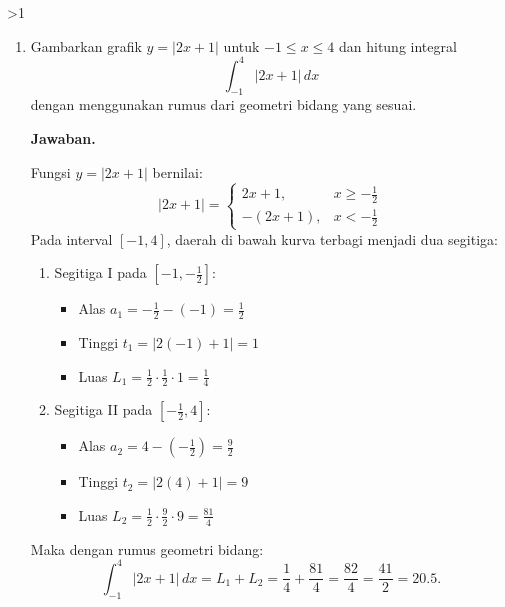 \documentclass[12pt]{article}
\newcommand{\answername}{Jawaban}
\newenvironment{soaljawab}[1]{%
    \ifnum#1>1\clearpage\fi
    \begin{tcolorbox}[enhanced,breakable,height fill,height fixed for=all,
        sharp corners,colback=white,colframe=black,boxrule=0.4bp,
        boxsep=0pt,left=12bp,right=12bp,top=6bp,bottom=10bp,
        before skip=0pt,after skip=0pt,pad at break=8bp]
    \fontsize{12bp}{14bp}\selectfont
    \setlength{\abovedisplayskip}{8bp}
    \setlength{\belowdisplayskip}{8bp}
    \setlength{\abovedisplayshortskip}{8bp}
    \setlength{\belowdisplayshortskip}{8bp}
    \renewcommand{\arraystretch}{1.15}
    \begin{enumerate}[start=#1,topsep=0pt]
}{%
    \end{enumerate}
    \end{tcolorbox}
}
\newcommand{\jawaban}{\par\medskip\textbf{\answername.}\par\smallskip}
\begin{document}
\begin{soaljawab}{3}
\item Gambarkan grafik $y = |2x + 1|$ untuk $-1 \le x \le 4$ dan hitung integral
        \[
          \int_{-1}^{4} |2x + 1| \, dx
        \]
        dengan menggunakan rumus dari geometri bidang yang sesuai.
\jawaban
Fungsi $y = |2x + 1|$ bernilai:
        \[
          |2x + 1| = \begin{cases}
            2x + 1,    & x \ge -\frac{1}{2} \\
            -(2x + 1), & x < -\frac{1}{2}
          \end{cases}
        \]
        Pada interval $[-1, 4]$, daerah di bawah kurva terbagi menjadi dua segitiga:
        \begin{enumerate}
          \item Segitiga I pada $\left[-1, -\frac{1}{2}\right]$:
                \begin{itemize}
                  \item Alas $a_1 = -\frac{1}{2} - (-1) = \frac{1}{2}$
                  \item Tinggi $t_1 = |2(-1) + 1| = 1$
                  \item Luas $L_1 = \frac{1}{2} \cdot \frac{1}{2} \cdot 1 = \frac{1}{4}$
                \end{itemize}
          \item Segitiga II pada $\left[-\frac{1}{2}, 4\right]$:
                \begin{itemize}
                  \item Alas $a_2 = 4 - \left(-\frac{1}{2}\right) = \frac{9}{2}$
                  \item Tinggi $t_2 = |2(4) + 1| = 9$
                  \item Luas $L_2 = \frac{1}{2} \cdot \frac{9}{2} \cdot 9 = \frac{81}{4}$
                \end{itemize}
        \end{enumerate}
        Maka dengan rumus geometri bidang:
        \[
          \int_{-1}^{4} |2x + 1| \, dx = L_1 + L_2 = \frac{1}{4} + \frac{81}{4} = \frac{82}{4} = \frac{41}{2} = 20.5.
        \]
\end{soaljawab}
\end{document}
